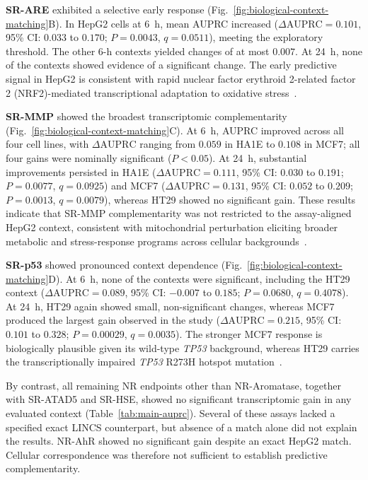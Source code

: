 \documentclass[11pt,a4paper]{article}
\begin{document}
\textbf{SR-ARE} exhibited a selective early response (Fig.~\ref{fig:biological-context-matching}B). In HepG2
cells at 6~h, mean AUPRC increased (\(\Delta\mathrm{AUPRC}=0.101\), 95\% CI: \(0.033\) to \(0.170\);
\(P=0.0043\), \(q=0.0511\)), meeting the exploratory threshold. The other 6-h
contexts yielded changes of at most \(0.007\). At 24~h, none of the contexts showed evidence of a significant change. The early predictive signal in HepG2 is
consistent with rapid nuclear factor erythroid 2-related factor 2
(NRF2)-mediated transcriptional adaptation to oxidative
stress~\cite{shukla2012are}.

\textbf{SR-MMP} showed the broadest transcriptomic complementarity
(Fig.~\ref{fig:biological-context-matching}C). At 6~h, AUPRC improved across
all four cell lines, with \(\Delta\mathrm{AUPRC}\) ranging from \(0.059\) in
HA1E to \(0.108\) in MCF7; all four gains were nominally significant
(\(P<0.05\)). At 24~h, substantial improvements persisted in HA1E
(\(\Delta\mathrm{AUPRC}=0.111\), 95\% CI: \(0.030\) to \(0.191\);
\(P=0.0077\), \(q=0.0925\)) and MCF7
(\(\Delta\mathrm{AUPRC}=0.131\), 95\% CI: \(0.052\) to \(0.209\);
\(P=0.0013\), \(q=0.0079\)), whereas HT29 showed no significant gain.
These results indicate that SR-MMP complementarity was not restricted to the assay-aligned HepG2 context, consistent with mitochondrial perturbation eliciting broader metabolic and stress-response programs across cellular backgrounds~\cite{zorova2018mitochondrial}.

\textbf{SR-p53} showed pronounced context dependence
(Fig.~\ref{fig:biological-context-matching}D). At 6~h,
none of the contexts were significant,
including the HT29 context (\(\Delta\mathrm{AUPRC}=0.089\), 95\% CI:
\(-0.007\) to \(0.185\); \(P=0.0680\), \(q=0.4078\)). At 24~h, HT29 again showed
small, non-significant changes, whereas MCF7 produced the largest gain observed
in the study (\(\Delta\mathrm{AUPRC}=0.215\), 95\% CI: \(0.101\) to \(0.328\);
\(P=0.00029\), \(q=0.0035\)). The stronger MCF7 response is biologically plausible given its
wild-type \textit{TP53} background, whereas HT29 carries the transcriptionally
impaired \textit{TP53} R273H hotspot
mutation~\cite{low2019mutantp53}.

By contrast, all remaining NR endpoints other than NR-Aromatase, together with
SR-ATAD5 and SR-HSE, showed no significant transcriptomic gain in any evaluated
context (Table~\ref{tab:main-auprc}). Several of these assays lacked a specified exact LINCS counterpart, but
absence of a match alone did not explain the results. NR-AhR showed no
significant gain despite an exact HepG2 match. Cellular correspondence was
therefore not sufficient to establish predictive complementarity.
\end{document}
